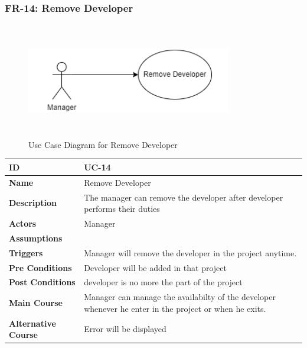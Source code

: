     \newpage

    \subsubsection{FR-14: Remove Developer}
    \begin{figure}[H]
        \includegraphics[height=5cm, width=0.8\textwidth]{./diagrams/Use Case/u14.png}
        \centering 
        \caption{Use Case Diagram for Remove Developer}
        \label{fig:Usecase1}
        \end{figure}
        
    \begin{center}
        \begin{tabularx}{\textwidth}{|l|X|}
            \hline
            \textbf{ID} & UC-14 \\
            \hline
            \textbf{Name} & Remove Developer \\
            \hline
            \textbf{Description} & The manager can remove the developer after developer performs their duties \\
            \hline
            \textbf{Actors} & Manager \\
            \hline
            \textbf{Assumptions} &  \\
            \hline
            \textbf{Triggers} & Manager will remove the developer in the project anytime. \\
            \hline
            \textbf{Pre Conditions} & Developer will be added in that project \\
            \hline
            \textbf{Post Conditions} & developer is no more the part of the project \\
            \hline
            \textbf{Main Course} & Manager can manage the availabilty of the developer whenever he enter in the project or when he exits. \\
            \hline
            \textbf{Alternative Course} & Error will be displayed \\
            \hline
            
        \end{tabularx}
    \end{center}
    \newpage
    

